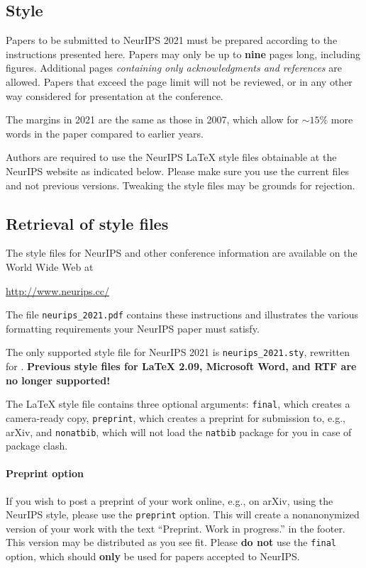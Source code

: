 \documentclass{article}
\begin{document}
\subsection{Style}

Papers to be submitted to NeurIPS 2021 must be prepared according to the
instructions presented here. Papers may only be up to {\bf nine} pages long,
including figures. Additional pages \emph{containing only acknowledgments and
references} are allowed. Papers that exceed the page limit will not be
reviewed, or in any other way considered for presentation at the conference.

The margins in 2021 are the same as those in 2007, which allow for $\sim$$15\%$
more words in the paper compared to earlier years.

Authors are required to use the NeurIPS \LaTeX{} style files obtainable at the
NeurIPS website as indicated below. Please make sure you use the current files
and not previous versions. Tweaking the style files may be grounds for
rejection.

\subsection{Retrieval of style files}

The style files for NeurIPS and other conference information are available on
the World Wide Web at
\begin{center}
  \url{http://www.neurips.cc/}
\end{center}
The file \verb+neurips_2021.pdf+ contains these instructions and illustrates the
various formatting requirements your NeurIPS paper must satisfy.

The only supported style file for NeurIPS 2021 is \verb+neurips_2021.sty+,
rewritten for \LaTeXe{}.  \textbf{Previous style files for \LaTeX{} 2.09,
  Microsoft Word, and RTF are no longer supported!}

The \LaTeX{} style file contains three optional arguments: \verb+final+, which
creates a camera-ready copy, \verb+preprint+, which creates a preprint for
submission to, e.g., arXiv, and \verb+nonatbib+, which will not load the
\verb+natbib+ package for you in case of package clash.

\paragraph{Preprint option}
If you wish to post a preprint of your work online, e.g., on arXiv, using the
NeurIPS style, please use the \verb+preprint+ option. This will create a
nonanonymized version of your work with the text ``Preprint. Work in progress.''
in the footer. This version may be distributed as you see fit. Please \textbf{do
  not} use the \verb+final+ option, which should \textbf{only} be used for
papers accepted to NeurIPS.
\end{document}
